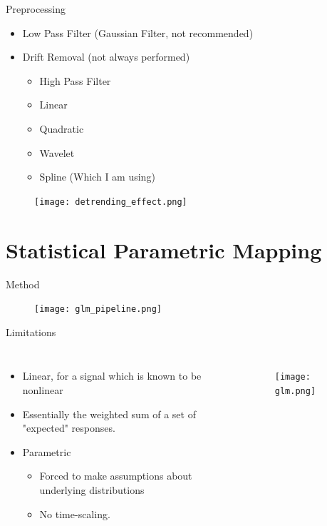 \documentclass{beamer}
\begin{document}
\begin{frame}{Preprocessing}
  \begin{itemize}
    \item Low Pass Filter (Gaussian Filter, not recommended)
    \item Drift Removal (not always performed)
    \begin{itemize}
        \item High Pass Filter
        \item Linear 
        \item Quadratic
        \item Wavelet 
        \item Spline (Which I am using)
    \end{itemize}
  \end{itemize}
  \begin{figure}
    \texttt{[image: detrending\_effect.png]}
    \caption{
        \tiny
        \cite{detrending}
    }
  \end{figure}
\end{frame}

\section{Statistical Parametric Mapping}
\begin{frame}{Method}
  \begin{figure}
    \texttt{[image: glm\_pipeline.png]}
    \caption{
        \tiny
        \cite{spm_pipeline}
    }
  \end{figure}
\end{frame}

\begin{frame}{Limitations}
\begin{columns}
  \column{2.5in}
  \begin{itemize}
    \item Linear, for a signal which is known to be nonlinear
    \item Essentially the weighted sum of a set of "expected" responses.
    \item Parametric
    \begin{itemize}
        \item Forced to make assumptions about underlying distributions
        \item No time-scaling.
    \end{itemize}
  \end{itemize}
  \column{3in}
  \begin{figure}
    \texttt{[image: glm.png]}
    \caption{
        \tiny
        \cite{spm_pipeline}
    }
  \end{figure}
\end{columns}
\end{frame}
\end{document}
